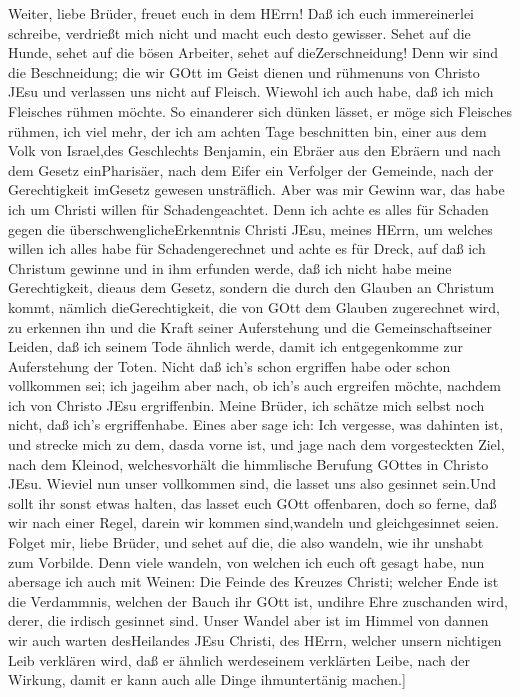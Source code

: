  Weiter, liebe Brüder, freuet euch in dem HErrn! Daß ich
euch immereinerlei schreibe, verdrießt mich nicht und macht euch desto
gewisser.  Sehet auf die Hunde, sehet auf die bösen
Arbeiter, sehet auf dieZerschneidung!  Denn wir sind die
Beschneidung; die wir GOtt im Geist dienen und rühmenuns von Christo
JEsu und verlassen uns nicht auf Fleisch.  Wiewohl ich auch
habe, daß ich mich Fleisches rühmen möchte. So einanderer sich dünken
lässet, er möge sich Fleisches rühmen, ich viel mehr,  der
ich am achten Tage beschnitten bin, einer aus dem Volk von Israel,des
Geschlechts Benjamin, ein Ebräer aus den Ebräern und nach dem Gesetz
einPharisäer,  nach dem Eifer ein Verfolger der Gemeinde,
nach der Gerechtigkeit imGesetz gewesen unsträflich.  Aber
was mir Gewinn war, das habe ich um Christi willen für Schadengeachtet.
 Denn ich achte es alles für Schaden gegen die
überschwenglicheErkenntnis Christi JEsu, meines HErrn, um welches willen
ich alles habe für Schadengerechnet und achte es für Dreck, auf daß ich
Christum gewinne  und in ihm erfunden werde, daß ich nicht
habe meine Gerechtigkeit, dieaus dem Gesetz, sondern die durch den
Glauben an Christum kommt, nämlich dieGerechtigkeit, die von GOtt dem
Glauben zugerechnet wird,  zu erkennen ihn und die Kraft
seiner Auferstehung und die Gemeinschaftseiner Leiden, daß ich seinem
Tode ähnlich werde,  damit ich entgegenkomme zur
Auferstehung der Toten.  Nicht daß ich's schon ergriffen
habe oder schon vollkommen sei; ich jageihm aber nach, ob ich's auch
ergreifen möchte, nachdem ich von Christo JEsu ergriffenbin.
 Meine Brüder, ich schätze mich selbst noch nicht, daß
ich's ergriffenhabe. Eines aber sage ich: Ich vergesse, was dahinten
ist, und strecke mich zu dem, dasda vorne ist,  und jage
nach dem vorgesteckten Ziel, nach dem Kleinod, welchesvorhält die
himmlische Berufung GOttes in Christo JEsu.  Wieviel nun
unser vollkommen sind, die lasset uns also gesinnet sein.Und sollt ihr
sonst etwas halten, das lasset euch GOtt offenbaren,  doch
so ferne, daß wir nach einer Regel, darein wir kommen sind,wandeln und
gleichgesinnet seien.  Folget mir, liebe Brüder, und sehet
auf die, die also wandeln, wie ihr unshabt zum Vorbilde. 
Denn viele wandeln, von welchen ich euch oft gesagt habe, nun abersage
ich auch mit Weinen: Die Feinde des Kreuzes Christi; 
welcher Ende ist die Verdammnis, welchen der Bauch ihr GOtt ist, undihre
Ehre zuschanden wird, derer, die irdisch gesinnet sind. 
Unser Wandel aber ist im Himmel von dannen wir auch warten desHeilandes
JEsu Christi, des HErrn,  welcher unsern nichtigen Leib
verklären wird, daß er ähnlich werdeseinem verklärten Leibe, nach der
Wirkung, damit er kann auch alle Dinge ihmuntertänig machen.{]}


